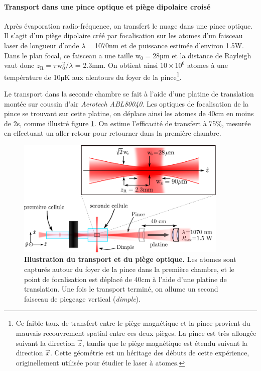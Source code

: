 \paragraph*{Transport dans une pince optique et piège dipolaire croisé}
Après évaporation radio-fréquence, on transfert le nuage dans une pince optique. Il s'agit d'un piège dipolaire créé par focalisation sur les atomes d'un faisceau laser de longueur d'onde $\lambda=$1070nm et de puissance estimée d'environ 1.5W. Dans le plan focal, ce faisceau a une taille $\mathrm{w}_{\mathrm{0}}=$28µm et la distance de Rayleigh vaut donc $z_{\mathrm{R}}= \pi \mathrm{w}_{\mathrm{0}}^2 / \lambda$ = 2.3mm. On obtient ainsi $10 \times 10^6$ atomes à une température de 10µK aux alentours du foyer de la pince\footnote{Ce faible taux de transfert entre le piège magnétique et la pince provient du mauvais recouvrement spatial entre ces deux pièges. La pince est très allongée suivant la direction $\vec{z}$, tandis que le piège magnétique est étendu suivant la direction $\vec{x}$. Cette géométrie est un héritage des débuts de cette expérience, originellement utilisée pour étudier le laser à atomes.}.

Le transport dans la seconde chambre se fait à l'aide d'une platine de translation montée sur coussin d'air \emph{Aerotech ABL80040}. Les optiques de focalisation de la pince se trouvant sur cette platine, on déplace ainsi les atomes de 40cm en moins de 2s, comme illustré figure \ref{fig:piege_optique}. On estime l'efficacité de transfert à 75\%, mesurée en effectuant un aller-retour pour retourner dans la première chambre.

\begin{figure}
\centering
\includegraphics[width=0.9\textwidth]{Fig/BEC_manip/piege_optique.pdf}
\caption{\textbf{Illustration du transport et du piège optique.} Les atomes sont capturés autour du foyer de la pince dans la première chambre, et le point de focalisation est déplacé de 40cm à l'aide d'une platine de translation. Une fois le transport terminé, on allume un second faisceau de piegeage vertical (\emph{dimple}).}
\label{fig:piege_optique}
\end{figure}

